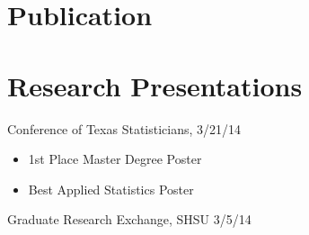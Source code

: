 \documentclass[letterpaper]{deedy-resume} %
\begin{document}
\section{Publication}
\vspace{\topsep}


\sectionspace
\noindent\makebox[\linewidth]{\rule{\paperwidth}{0.4pt}}


\section{Research Presentations}


\vspace{\topsep}
\begin{tightitemize}
	 \item  {Conference of Texas Statisticians, 3/21/14}\\
     \begin{itemize}
	
    \item 1st Place Master Degree Poster
    \item Best Applied Statistics Poster
    \end{itemize}
	 \item  {Graduate Research Exchange, SHSU 3/5/14}
\end{tightitemize}
\vspace{\topsep}
\end{document}
